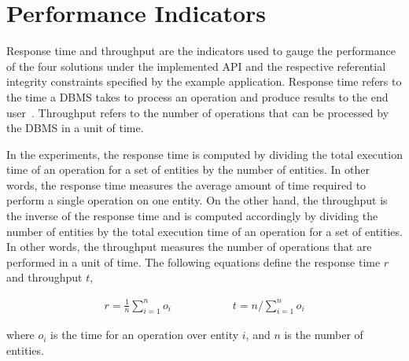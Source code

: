 \section{Performance Indicators} \label{sexp:PerformanceIndicators}

Response time and throughput are the indicators used to gauge the
performance of the four solutions under the implemented \ac{API} and the
respective referential integrity constraints specified by the example
application.  Response time refers to the time a \ac{DBMS}  takes to process an
operation and produce results to the end user~\citep{boral}.  Throughput  refers
to  the number of operations that can be processed by the \ac{DBMS} in a unit of
time.

In the experiments,  the response time is computed by dividing the total
execution time of an operation for a set of entities by the number of entities. 
In other words,  the response time measures the average amount of time required
to perform a single operation on one entity.  On the other hand,  the throughput
is the inverse of the response time and is computed accordingly by dividing the
number of entities by the total execution time of an operation for a set of
entities.  In other words, the throughput measures the number of operations that
are performed in a unit of time.  The following equations define the response
time $r$ and throughput
$t$,
 


\begin{equation*}
\begin{gathered}
\displaystyle r = \frac{1}{n}\sum_{i = 1}^{n}{o_i}
\end{gathered} \hspace{2cm}
\begin{gathered}
t = n / \sum_{i = 1}^{n}{o_i}  
\end{gathered}
\end{equation*}

% 	 

\noindent where $o_i$ is the time for an operation over entity $i$,  and  $n$ is
the number of entities. 


